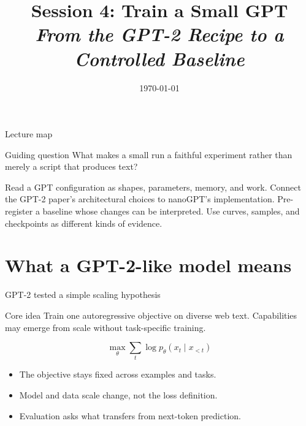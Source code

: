 \documentclass[handout]{beamer}
\title[TLM -- Session 04]{Session 4: Train a Small GPT\\[4pt]
\normalsize\itshape From the GPT-2 Recipe to a Controlled Baseline}
\date{\today}
\begin{document}
\makelecturetitle

\begin{frame}{Lecture map}
  \tableofcontents
  \vfill
  \begin{block}{Guiding question}
    What makes a small run a faithful experiment rather than merely a script that produces text?
  \end{block}
\end{frame}

\learninggoals
  {Read a GPT configuration as shapes, parameters, memory, and work.}
  {Connect the GPT-2 paper's architectural choices to nanoGPT's implementation.}
  {Pre-register a baseline whose changes can be interpreted.}
  {Use curves, samples, and checkpoints as different kinds of evidence.}

\section{What a GPT-2-like model means}

\begin{frame}{GPT-2 tested a simple scaling hypothesis}
  \begin{block}{Core idea}
    Train one autoregressive objective on diverse web text. Capabilities may emerge from scale without task-specific training.
  \end{block}
  \[
    \max_\theta \sum_t \log p_\theta(x_t\mid x_{<t})
  \]
  \begin{itemize}
    \setlength{\itemsep}{7pt}
    \item The objective stays fixed across examples and tasks.
    \item Model and data scale change, not the loss definition.
    \item Evaluation asks what transfers from next-token prediction.
  \end{itemize}
\end{frame}
\end{document}
